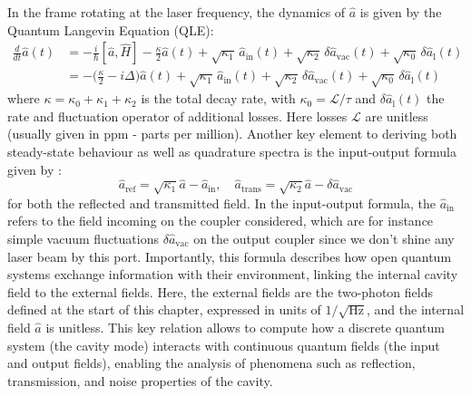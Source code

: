  
 In the frame rotating at the laser frequency, the dynamics of \(\hat{a}\) is given by the Quantum Langevin Equation (QLE):
%
\begin{equation}
\begin{split}
  \frac{d}{dt} \hat{a}(t) & = -\frac{i}{\hbar} [\hat{a}, \hat{H}] - \frac{\kappa}{2} \hat{a}(t) + \sqrt{\kappa_1} \, \hat{a}_{\mathrm{in}}(t)  + \sqrt{\kappa_2} \, \delta \hat{a}_{\mathrm{vac}}(t) + \sqrt{\kappa_0} \, \delta \hat{a}_{\mathrm{l}}(t) \\
  & = -\Big(\frac{\kappa}{2}-i\Delta\Big) \hat{a}(t) + \sqrt{\kappa_{\mathrm{1}}} \, \hat{a}_{\mathrm{in}}(t)  + \sqrt{\kappa_2} \, \delta \hat{a}_{\mathrm{vac}}(t)  + \sqrt{\kappa_0} \, \delta \hat{a}_{\mathrm{l}}(t) 
\label{eq:qle}
\end{split}
\end{equation}
where  \(\kappa = \kappa_0 + \kappa_1 + \kappa_2\) is the total decay rate, with $\kappa_0=\mathcal{L}/\tau$ and $ \delta \hat{a}_{\mathrm{l}}(t)$ the rate and fluctuation operator of additional losses. Here losses $\mathcal{L}$ are unitless (usually given in ppm - parts per million). Another key element to deriving both steady-state behaviour as well as quadrature spectra is the input-output formula given by \cite{gardiner}:
\begin{equation}
  \hat{a}_{\mathrm{ref}} = \sqrt{\kappa_{1}}\hat{a} - \hat{a}_{\mathrm{in}} , \quad \hat{a}_{\mathrm{trans}} = \sqrt{\kappa_{2}}\hat{a} - \delta \hat{a}_{\mathrm{vac}} 
\end{equation}
for both the reflected and transmitted field. In the input-output formula, the $\hat{a}_{\mathrm{in}}$ refers to the field incoming on the coupler considered, which are for instance simple vacuum fluctuations $\delta \hat{a}_{\mathrm{vac}}$ on the output coupler since we don't shine any laser beam by this port. Importantly, this formula describes how open quantum systems exchange information with their environment, linking the internal cavity field to the external fields. Here, the external fields are the two-photon fields defined at the start of this chapter, expressed in units of $1/\sqrt{\text{Hz}}$, and the internal field $\hat a$ is unitless. This key relation allows to compute how a discrete quantum system (the cavity mode) interacts with continuous quantum fields (the input and output fields), enabling the analysis of phenomena such as reflection, transmission, and noise properties of the cavity. \\


